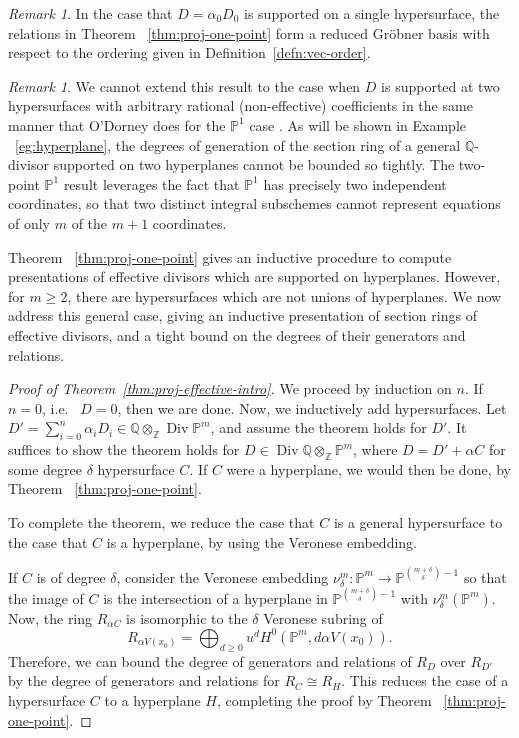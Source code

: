 \documentclass{amsart}
\theoremstyle{plain}
\theoremstyle{definition}
\theoremstyle{remark}
\newtheorem{rem}[thm]{Remark}
\numberwithin{equation}{subsection}
\newcommand\bq{{\mathbb Q}}
\newcommand\bp{{\mathbb P}}
\newcommand\bz{{\mathbb Z}}
\DeclareMathOperator\di{Div}
\newcommand\pdeg{\delta}
\begin{document}
\begin{rem}
\label{rem:proj-grobner}
	In the case that $D = \alpha_0 D_0$ is supported on a single
	hypersurface, the relations in Theorem ~\ref{thm:proj-one-point}
	form a reduced Gr\"{o}bner basis with respect to the ordering
	given in Definition~\ref{defn:vec-order}.
\end{rem}

\begin{rem}
\label{rem:proj-two-points}
We cannot extend this result to the case when
$D$ is supported at two hypersurfaces with arbitrary rational (non-effective)
coefficients in the same manner that O'Dorney does for the
$\bp^1$ case \cite[Section 4]{dorney:canonical}. As will be shown
in Example ~\ref{eg:hyperplane}, the degrees of generation of the
section ring of a general $\bq$-divisor supported on two
hyperplanes cannot be bounded so tightly. The two-point
$\bp^1$ result leverages the fact that $\bp^1$ has precisely two
independent coordinates, so that two distinct integral subschemes
cannot represent equations of only $m$ of the $m+1$ coordinates.
\end{rem}

Theorem ~\ref{thm:proj-one-point} gives an inductive procedure to
compute presentations of effective divisors which are supported on
hyperplanes. However, for $m \geq 2$, there are hypersurfaces which
are not unions of hyperplanes. We now address this general case, giving an inductive presentation of section rings of effective divisors, and a tight bound on the degrees of their generators and
relations.

\begin{proof}[Proof of Theorem~\ref{thm:proj-effective-intro}]
We proceed by induction on $n$.
If $n = 0$, i.e.~ $D = 0$, then we are done.
Now, we inductively add hypersurfaces.
Let $D' = \sum_{i = 0}^{n} \alpha_i D_i \in \bq \otimes_\bz \di \bp^m$, 
and assume the theorem holds for $D'$. It suffices to show
the theorem holds for $D \in \di \bq \otimes_\bz \bp^m$, where $D = D' + \alpha C$ for some
degree $\pdeg$ hypersurface $C$.
If $C$ were a hyperplane, we would then be done, by Theorem ~\ref{thm:proj-one-point}.

To complete the theorem, we reduce the case that $C$ is a general hypersurface
to the case that $C$ is a hyperplane, by using the Veronese embedding.

If $C$ is of degree $\pdeg$, consider the Veronese embedding
$\nu_\pdeg^m \colon \bp^m \rightarrow \bp^{\binom{m+\pdeg}{\pdeg}-1}$
so that the image of $C$ is the intersection of 
a hyperplane in $\bp^{\binom{{m + \pdeg}}{\pdeg} - 1}$ with $\nu_\pdeg^m(\bp^m)$.
Now, the ring $R_{\alpha C}$ is isomorphic to the
$\pdeg$ Veronese subring of 
\[R_{\alpha V(x_0)} = \bigoplus_{d \geq 0} u^d H^0(\bp^m, d \alpha V(x_0)).\]
Therefore, we can bound the degree of generators and relations of
$R_D$ over $R_{D'}$ by the degree of generators and
relations for $R_C \cong R_H.$
This reduces the case of a hypersurface $C$ to
a hyperplane $H$, completing the proof by Theorem
~\ref{thm:proj-one-point}.
\end{proof}
\end{document}

